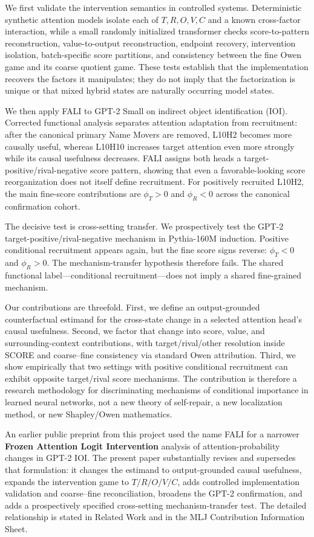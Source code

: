 We first validate the intervention semantics in controlled systems. Deterministic synthetic attention models isolate each of $T,R,O,V,C$ and a known cross-factor interaction, while a small randomly initialized transformer checks score-to-pattern reconstruction, value-to-output reconstruction, endpoint recovery, intervention isolation, batch-specific score partitions, and consistency between the fine Owen game and its coarse quotient game. These tests establish that the implementation recovers the factors it manipulates; they do not imply that the factorization is unique or that mixed hybrid states are naturally occurring model states.

We then apply FALI to GPT-2 Small on indirect object identification (IOI). Corrected functional analysis separates attention adaptation from recruitment: after the canonical primary Name Movers are removed, L10H2 becomes more causally useful, whereas L10H10 increases target attention even more strongly while its causal usefulness decreases. FALI assigns both heads a target-positive/rival-negative score pattern, showing that even a favorable-looking score reorganization does not itself define recruitment. For positively recruited L10H2, the main fine-score contributions are $\phi_T>0$ and $\phi_R<0$ across the canonical confirmation cohort.

The decisive test is cross-setting transfer. We prospectively test the GPT-2 target-positive/rival-negative mechanism in Pythia-160M induction. Positive conditional recruitment appears again, but the fine score signs reverse: $\phi_T<0$ and $\phi_R>0$. The mechanism-transfer hypothesis therefore fails. The shared functional label---conditional recruitment---does not imply a shared fine-grained mechanism.

Our contributions are threefold. First, we define an output-grounded counterfactual estimand for the cross-state change in a selected attention head's causal usefulness. Second, we factor that change into score, value, and surrounding-context contributions, with target/rival/other resolution inside SCORE and coarse--fine consistency via standard Owen attribution. Third, we show empirically that two settings with positive conditional recruitment can exhibit opposite target/rival score mechanisms. The contribution is therefore a research methodology for discriminating mechanisms of conditional importance in learned neural networks, not a new theory of self-repair, a new localization method, or new Shapley/Owen mathematics.

An earlier public preprint from this project used the name FALI for a narrower \textbf{Frozen Attention Logit Intervention} analysis of attention-probability changes in GPT-2 IOI. The present paper substantially revises and supersedes that formulation: it changes the estimand to output-grounded causal usefulness, expands the intervention game to $T/R/O/V/C$, adds controlled implementation validation and coarse--fine reconciliation, broadens the GPT-2 confirmation, and adds a prospectively specified cross-setting mechanism-transfer test. The detailed relationship is stated in Related Work and in the MLJ Contribution Information Sheet.

